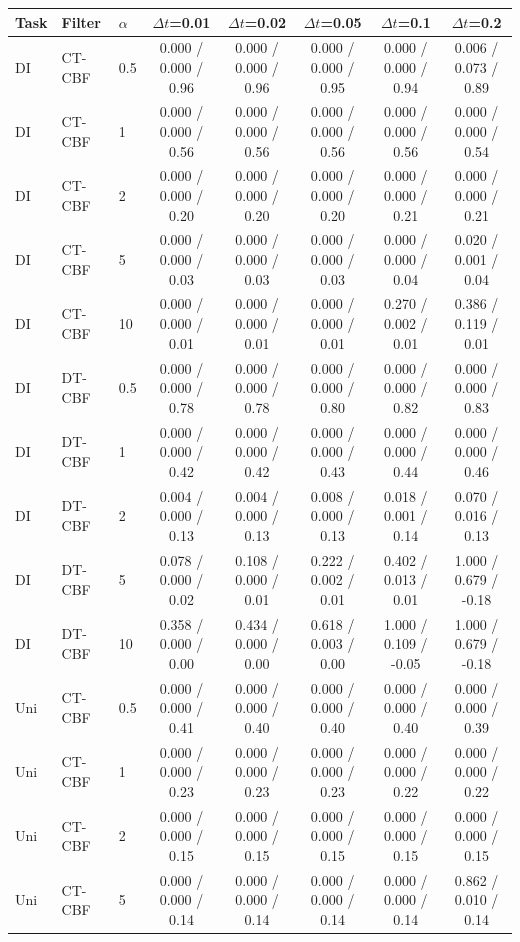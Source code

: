 \begin{tabular}{lllccccc}
\hline
Task & Filter & $\alpha$ & $\Delta t$=0.01 & $\Delta t$=0.02 & $\Delta t$=0.05 & $\Delta t$=0.1 & $\Delta t$=0.2 \\
\hline
DI & CT-CBF & 0.5 & 0.000 / 0.000 / 0.96 & 0.000 / 0.000 / 0.96 & 0.000 / 0.000 / 0.95 & 0.000 / 0.000 / 0.94 & 0.006 / 0.073 / 0.89 \\
DI & CT-CBF & 1 & 0.000 / 0.000 / 0.56 & 0.000 / 0.000 / 0.56 & 0.000 / 0.000 / 0.56 & 0.000 / 0.000 / 0.56 & 0.000 / 0.000 / 0.54 \\
DI & CT-CBF & 2 & 0.000 / 0.000 / 0.20 & 0.000 / 0.000 / 0.20 & 0.000 / 0.000 / 0.20 & 0.000 / 0.000 / 0.21 & 0.000 / 0.000 / 0.21 \\
DI & CT-CBF & 5 & 0.000 / 0.000 / 0.03 & 0.000 / 0.000 / 0.03 & 0.000 / 0.000 / 0.03 & 0.000 / 0.000 / 0.04 & 0.020 / 0.001 / 0.04 \\
DI & CT-CBF & 10 & 0.000 / 0.000 / 0.01 & 0.000 / 0.000 / 0.01 & 0.000 / 0.000 / 0.01 & 0.270 / 0.002 / 0.01 & 0.386 / 0.119 / 0.01 \\
\hline
DI & DT-CBF & 0.5 & 0.000 / 0.000 / 0.78 & 0.000 / 0.000 / 0.78 & 0.000 / 0.000 / 0.80 & 0.000 / 0.000 / 0.82 & 0.000 / 0.000 / 0.83 \\
DI & DT-CBF & 1 & 0.000 / 0.000 / 0.42 & 0.000 / 0.000 / 0.42 & 0.000 / 0.000 / 0.43 & 0.000 / 0.000 / 0.44 & 0.000 / 0.000 / 0.46 \\
DI & DT-CBF & 2 & 0.004 / 0.000 / 0.13 & 0.004 / 0.000 / 0.13 & 0.008 / 0.000 / 0.13 & 0.018 / 0.001 / 0.14 & 0.070 / 0.016 / 0.13 \\
DI & DT-CBF & 5 & 0.078 / 0.000 / 0.02 & 0.108 / 0.000 / 0.01 & 0.222 / 0.002 / 0.01 & 0.402 / 0.013 / 0.01 & 1.000 / 0.679 / -0.18 \\
DI & DT-CBF & 10 & 0.358 / 0.000 / 0.00 & 0.434 / 0.000 / 0.00 & 0.618 / 0.003 / 0.00 & 1.000 / 0.109 / -0.05 & 1.000 / 0.679 / -0.18 \\
\hline
Uni & CT-CBF & 0.5 & 0.000 / 0.000 / 0.41 & 0.000 / 0.000 / 0.40 & 0.000 / 0.000 / 0.40 & 0.000 / 0.000 / 0.40 & 0.000 / 0.000 / 0.39 \\
Uni & CT-CBF & 1 & 0.000 / 0.000 / 0.23 & 0.000 / 0.000 / 0.23 & 0.000 / 0.000 / 0.23 & 0.000 / 0.000 / 0.22 & 0.000 / 0.000 / 0.22 \\
Uni & CT-CBF & 2 & 0.000 / 0.000 / 0.15 & 0.000 / 0.000 / 0.15 & 0.000 / 0.000 / 0.15 & 0.000 / 0.000 / 0.15 & 0.000 / 0.000 / 0.15 \\
Uni & CT-CBF & 5 & 0.000 / 0.000 / 0.14 & 0.000 / 0.000 / 0.14 & 0.000 / 0.000 / 0.14 & 0.000 / 0.000 / 0.14 & 0.862 / 0.010 / 0.14 \\

\end{tabular}
